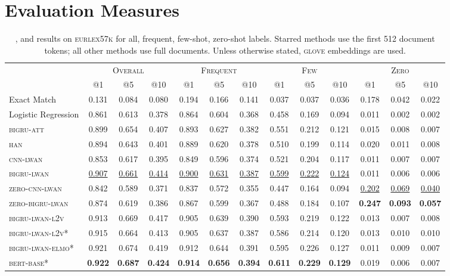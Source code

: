 \documentclass[11pt,a4paper]{article}
\newcommand{\bigruatt}{\textsc{bigru-att}\xspace}
\newcommand{\han}{\textsc{han}\xspace}
\newcommand{\lwancnn}{\textsc{cnn-lwan}\xspace}
\newcommand{\zlwancnn}{\textsc{zero-cnn-lwan}\xspace}
\newcommand{\lwangru}{\textsc{bigru-lwan}\xspace}
\newcommand{\lwangrulv}{\textsc{bigru-lwan-l2v}}
\newcommand{\lwangruelmo}{\textsc{bigru-lwan-elmo}}
\newcommand{\zlwangru}{\textsc{zero-bigru-lwan}\xspace}
\newcommand{\glove}{\textsc{glove}\xspace}
\newcommand{\bertbase}{\textsc{bert-base}\xspace}
\newcommand{\newdata}{\textsc{eurlex57k}\xspace}
\begin{document}
\section{Evaluation Measures}

\begin{table*}[ht!]
\centering
{
\footnotesize\addtolength{\tabcolsep}{-2pt}
\begin{tabular}{lcccccccccccc}
  \hline
  & \multicolumn{3}{c}{\textsc{Overall}} & \multicolumn{3}{c}{\textsc{Frequent}} & \multicolumn{3}{c}{\textsc{Few}} & \multicolumn{3}{c}{\textsc{Zero}} \\ 
  & @1 & @5 & @10 & @1 & @5 & @10 & @1 & @5 & @10 & @1 & @5 & @10 \\
  \cline{2-13}
  Exact Match & 0.131 & 0.084 & 0.080 & 0.194 & 0.166 & 0.141 & 0.037 & 0.037 & 0.036 & 0.178 & 0.042 & 0.022 \\
  Logistic Regression & 0.861 & 0.613 & 0.378 & 0.864 & 0.604 & 0.368 & 0.458 & 0.169 & 0.094 & 0.011 & 0.002 & 0.002 \\
  \hline
  \bigruatt & 0.899 & 0.654 & 0.407 & 0.893 & 0.627 & 0.382 & 0.551 & 0.212 & 0.121 & 0.015 & 0.008 & 0.007 \\
  \han & 0.894 & 0.643 & 0.401 & 0.889 & 0.620 & 0.378 & 0.510 & 0.199 & 0.114 & 0.020 & 0.011 & 0.008 \\
  \hline
 \lwancnn & 0.853 & 0.617 & 0.395 & 0.849 & 0.596 & 0.374 & 0.521 & 0.204 & 0.117 & 0.011 & 0.007 & 0.007 \\
  \lwangru & \underline{0.907} & \underline{0.661} & \underline{0.414} & \underline{0.900} & \underline{0.631} & \underline{0.387} & \underline{0.599} & \underline{0.222} & \underline{0.124} & 0.011 & 0.006 & 0.006 \\
   \hline
  \zlwancnn & 0.842 & 0.589 & 0.371 & 0.837 & 0.572 & 0.355 & 0.447 & 0.164 & 0.094 & \underline{0.202} & \underline{0.069} & \underline{0.040} \\
  \zlwangru & 0.874 & 0.619 & 0.386 & 0.867 & 0.599 & 0.367 & 0.488 & 0.184 & 0.107 & \textbf{0.247} & \textbf{0.093} & \textbf{0.057} \\
  \hline\hline
   \lwangrulv & 0.913 & 0.669 & 0.417 & 0.905 & 0.639 & 0.390 & 0.593 & 0.219 & 0.122 & 0.013 & 0.007 & 0.008 \\
\hline
\lwangrulv* & 0.915 & 0.664 & 0.413 & 0.905 & 0.637 & 0.387 & 0.586 & 0.214 & 0.120 & 0.013 & 0.010 & 0.010 \\
\lwangruelmo* & 0.921 & 0.674 & 0.419 & 0.912 & 0.644 & 0.391 & 0.595 & 0.226 & 0.127 & 0.011 & 0.009 & 0.007 \\
  \bertbase* & \textbf{0.922} & \textbf{0.687} & \textbf{0.424} & \textbf{0.914} & \textbf{0.656} & \textbf{0.394} & \textbf{0.611} & \textbf{0.229} & \textbf{0.129} & 0.019 & 0.006 & 0.007 \\
  \hline
\end{tabular}
}
\caption{,  and  results on \newdata for all, frequent, few-shot, zero-shot labels. Starred methods use the first 512 document tokens; all other methods use full documents. Unless otherwise stated, \glove embeddings are used.}
\label{tab:presults}
\end{table*}
\end{document}
